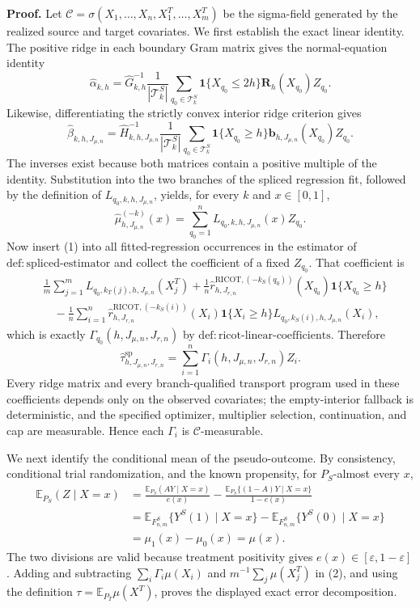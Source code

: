 \textbf{Proof.}
Let \(\mathcal C=\sigma(X_1,\ldots,X_n,X_1^T,\ldots,X_m^T)\) be the sigma-field generated by the realized source and target covariates.  We first establish the exact linear identity.  The positive ridge in each boundary Gram matrix gives the normal-equation identity
\[
\widehat\alpha_{k,h}
=\widehat G_{k,h}^{-1}\frac{1}{|\mathcal T_k^S|}
\sum_{q_0\in\mathcal T_k^S}\mathbf 1\{X_{q_0}\le 2h\}\mathbf R_h(X_{q_0})Z_{q_0}.
\]
Likewise, differentiating the strictly convex interior ridge criterion gives
\[
\widehat\beta_{k,h,J_{\mu,n}}
=\widehat H_{k,h,J_{\mu,n}}^{-1}\frac{1}{|\mathcal T_k^S|}
\sum_{q_0\in\mathcal T_k^S}\mathbf 1\{X_{q_0}\ge h\}
\mathbf b_{h,J_{\mu,n}}(X_{q_0})Z_{q_0}.
\]
The inverses exist because both matrices contain a positive multiple of the identity.  Substitution into the two branches of the spliced regression fit, followed by the definition of \(L_{q_0,k,h,J_{\mu,n}}\), yields, for every \(k\) and \(x\in[0,1]\),
\[
\widehat\mu^{(-k)}_{h,J_{\mu,n}}(x)
=\sum_{q_0=1}^nL_{q_0,k,h,J_{\mu,n}}(x)Z_{q_0}.
\tag{1}
\]
Now insert (1) into all fitted-regression occurrences in the estimator of \(\mathrm{def:spliced\text{-}estimator}\) and collect the coefficient of a fixed \(Z_{q_0}\).  That coefficient is
\[
\begin{aligned}
{}&\frac1m\sum_{j=1}^mL_{q_0,k_T(j),h,J_{\mu,n}}(X_j^T)
+\frac1n\widehat r^{\mathrm{RICOT},(-k_S(q_0))}_{h,J_{r,n}}(X_{q_0})
\mathbf 1\{X_{q_0}\ge h\}\\
&\quad-\frac1n\sum_{i=1}^n
\widehat r^{\mathrm{RICOT},(-k_S(i))}_{h,J_{r,n}}(X_i)
\mathbf 1\{X_i\ge h\}L_{q_0,k_S(i),h,J_{\mu,n}}(X_i),
\end{aligned}
\]
which is exactly \(\Gamma_{q_0}(h,J_{\mu,n},J_{r,n})\) by \(\mathrm{def:ricot\text{-}linear\text{-}coefficients}\).  Therefore
\[
\widehat\tau^{\mathrm{sp}}_{h,J_{\mu,n},J_{r,n}}
=\sum_{i=1}^n\Gamma_i(h,J_{\mu,n},J_{r,n})Z_i.
\tag{2}
\]
Every ridge matrix and every branch-qualified transport program used in these coefficients depends only on the observed covariates; the empty-interior fallback is deterministic, and the specified optimizer, multiplier selection, continuation, and cap are measurable.  Hence each \(\Gamma_i\) is \(\mathcal C\)-measurable.

We next identify the conditional mean of the pseudo-outcome.  By consistency, conditional trial randomization, and the known propensity, for \(P_S\)-almost every \(x\),
\[
\begin{aligned}
\mathbb E_{P_S}(Z\mid X=x)
&=\frac{\mathbb E_{P_S}(AY\mid X=x)}{e(x)}
-\frac{\mathbb E_{P_S}\{(1-A)Y\mid X=x\}}{1-e(x)}\\
&=\mathbb E_{F^S_{n,m}}\{Y^S(1)\mid X=x\}
-\mathbb E_{F^S_{n,m}}\{Y^S(0)\mid X=x\}\\
&=\mu_1(x)-\mu_0(x)=\mu(x).
\end{aligned}
\tag{3}
\]
The two divisions are valid because treatment positivity gives \(e(x)\in[\varepsilon,1-\varepsilon]\).  Adding and subtracting \(\sum_i\Gamma_i\mu(X_i)\) and \(m^{-1}\sum_j\mu(X_j^T)\) in (2), and using the definition \(\tau=\mathbb E_{P_T}\mu(X^T)\), proves the displayed exact error decomposition.

